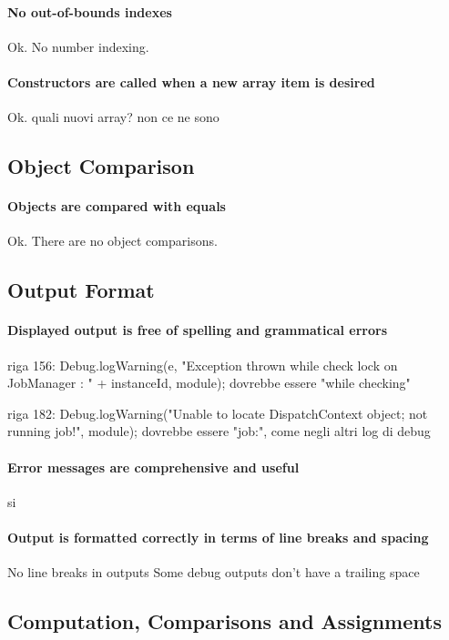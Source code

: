 \documentclass[english]{article}
\begin{document}
\paragraph{No out-of-bounds indexes}
Ok.
No number indexing.

\paragraph{Constructors are called when a new array item is desired}
Ok.
quali nuovi array? non ce ne sono

\subsection{Object Comparison}
\paragraph{Objects are compared with equals}
Ok.
There are no object comparisons.

\subsection{Output Format}
\paragraph{Displayed output is free of spelling and grammatical errors}
riga 156:
Debug.logWarning(e, "Exception thrown while check lock on JobManager : " + instanceId, module);
dovrebbe essere "while checking"

riga 182:
Debug.logWarning("Unable to locate DispatchContext object; not running job!", module);
dovrebbe essere "job:", come negli altri log di debug

\paragraph{Error messages are comprehensive and useful}
si

\paragraph{Output is formatted correctly in terms of line breaks and spacing}
No line breaks in outputs
Some debug outputs don't have a trailing space ~

\subsection{Computation, Comparisons and Assignments}
\end{document}

